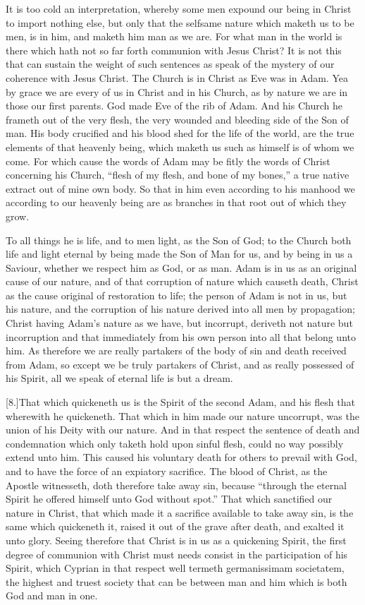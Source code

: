 It is too cold an interpretation, whereby some men expound our being in Christ to import nothing else, but only that the selfsame nature which maketh us to be men, is in him, and maketh him man as we are. For what man in the world is there which hath not so far forth communion with Jesus Christ? It is not this that can sustain the weight of such sentences as speak of the mystery of our coherence with Jesus Christ. The Church is in Christ as Eve was in Adam. Yea by grace we are every of us in Christ and in his Church, as by nature we are in those our first parents. God made Eve of the rib of Adam. And his Church he frameth out of the very flesh, the very wounded and bleeding side of the Son of man. His body crucified and his blood shed for the life of the world, are the true elements of that heavenly being, which maketh us such as himself is of whom we come. For which cause the words of Adam may be fitly the words of Christ concerning his Church, “flesh of my flesh, and bone of my bones,” a true native extract out of mine own body. So that in him even according to his manhood we according to our heavenly being are as branches in that root out of which they grow.

To all things he is life, and to men light, as the Son of God; to the Church both life and light eternal by being made the Son of Man for us, and by being in us a Saviour, whether we respect him as God, or as man. Adam is in us as an original cause of our nature, and of that corruption of nature which causeth death, Christ as the cause original of restoration to life; the person of Adam is not in us, but his nature, and the corruption of his nature derived into all men by propagation; Christ having Adam’s nature as we have, but incorrupt, deriveth not nature but incorruption and that immediately from his own person into all that belong unto him. As therefore we are really partakers of the body of sin and death  received from Adam, so except we be truly partakers of Christ, and as really possessed of his Spirit, all we speak of eternal life is but a dream.

[8.]That which quickeneth us is the Spirit of the second Adam, and his flesh that wherewith he quickeneth. That which in him made our nature uncorrupt, was the union of his Deity with our nature. And in that respect the sentence of death and condemnation which only taketh hold upon sinful flesh, could no way possibly extend unto him. This caused his voluntary death for others to prevail with God, and to have the force of an expiatory sacrifice. The blood of Christ, as the Apostle witnesseth, doth therefore take away sin, because “through the eternal Spirit he offered himself unto God without spot.” That which sanctified our nature in Christ, that which made it a sacrifice available to take away sin, is the same which quickeneth it, raised it out of the grave after death, and exalted it unto glory. Seeing therefore that Christ is in us as a quickening Spirit, the first degree of communion with Christ must needs consist in the participation of his Spirit, which Cyprian in that respect well termeth germanissimam societatem, the highest and truest society that can be between man and him which is both God and man in one.

